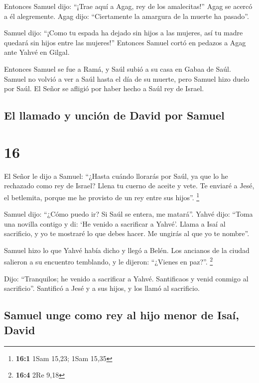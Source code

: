  Entonces Samuel dijo: ``¡Trae aquí a Agag, rey de los
amalecitas!'' Agag se acercó a él alegremente. Agag dijo: ``Ciertamente
la amargura de la muerte ha pasado''.

 Samuel dijo: ``¡Como tu espada ha dejado sin hijos a las
mujeres, así tu madre quedará sin hijos entre las mujeres!'' Entonces
Samuel cortó en pedazos a Agag ante Yahvé en Gilgal.

 Entonces Samuel se fue a Ramá, y Saúl subió a su casa en
Gabaa de Saúl.  Samuel no volvió a ver a Saúl hasta el
día de su muerte, pero Samuel hizo duelo por Saúl. El Señor se afligió
por haber hecho a Saúl rey de Israel.

\hypertarget{el-llamado-y-unciuxf3n-de-david-por-samuel}{%
\subsection{El llamado y unción de David por
Samuel}\label{el-llamado-y-unciuxf3n-de-david-por-samuel}}

\hypertarget{section-15}{%
\section{16}\label{section-15}}

 El Señor le dijo a Samuel: ``¿Hasta cuándo llorarás por
Saúl, ya que lo he rechazado como rey de Israel? Llena tu cuerno de
aceite y vete. Te enviaré a Jesé, el betlemita, porque me he provisto de
un rey entre sus hijos''. \footnote{\textbf{16:1} 1Sam 15,23; 1Sam 15,35}

 Samuel dijo: ``¿Cómo puedo ir? Si Saúl se entera, me
matará''. Yahvé dijo: ``Toma una novilla contigo y di: `He venido a
sacrificar a Yahvé'.  Llama a Isaí al sacrificio, y yo te
mostraré lo que debes hacer. Me ungirás al que yo te nombre''.

 Samuel hizo lo que Yahvé había dicho y llegó a Belén. Los
ancianos de la ciudad salieron a su encuentro temblando, y le dijeron:
``¿Vienes en paz?''. \footnote{\textbf{16:4} 2Re 9,18}

 Dijo: ``Tranquilos; he venido a sacrificar a Yahvé.
Santificaos y venid conmigo al sacrificio''. Santificó a Jesé y a sus
hijos, y los llamó al sacrificio.

\hypertarget{samuel-unge-como-rey-al-hijo-menor-de-isauxed-david}{%
\subsection{Samuel unge como rey al hijo menor de Isaí,
David}\label{samuel-unge-como-rey-al-hijo-menor-de-isauxed-david}}


